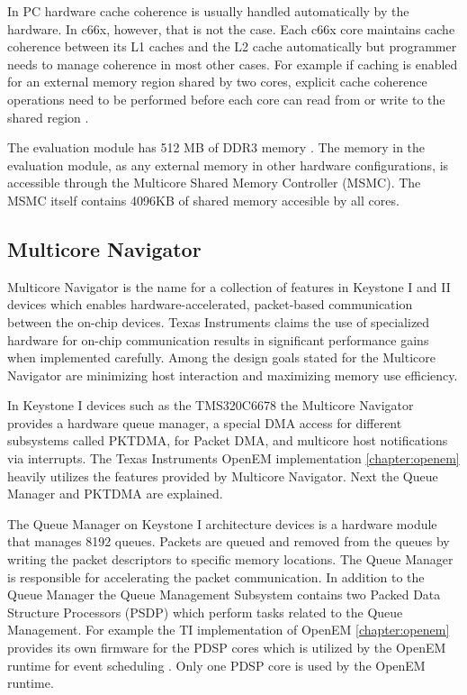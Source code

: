 In PC hardware cache coherence is usually handled automatically by the hardware. In c66x, however, that is not the case. Each c66x core maintains cache coherence between its L1 caches and the L2 cache automatically but programmer needs to manage coherence in most other cases. For example if caching is enabled for an external memory region shared by two cores, explicit cache coherence operations need to be performed before each core can read from or write to the shared region \cite{cacheguide}.

The evaluation module has 512 MB of DDR3 memory \cite{evmref}. The memory in the evaluation module, as any external memory in other hardware configurations, is accessible through the Multicore Shared Memory Controller (MSMC). The MSMC itself contains 4096KB of shared memory accesible by all cores.

\subsection{Multicore Navigator}
\label{subsec:multicorenav}


Multicore Navigator is the name for a collection of features in Keystone I and II devices which enables hardware-accelerated, packet-based communication between the on-chip devices. Texas Instruments claims the use of specialized hardware for on-chip communication results in significant performance gains when implemented carefully. Among the design goals stated for the Multicore Navigator are minimizing host interaction and maximizing memory use efficiency. \cite{navigator}

In Keystone I devices such as the TMS320C6678 the Multicore Navigator provides a hardware queue manager, a special DMA access for different subsystems called PKTDMA, for Packet DMA, and multicore host notifications via interrupts. \cite{navigator} The Texas Instruments OpenEM implementation \ref{chapter:openem} heavily utilizes the features provided by Multicore Navigator. Next the Queue Manager and PKTDMA are explained.

The Queue Manager on Keystone I architecture devices is a hardware module that manages 8192 queues. Packets are queued and removed from the queues by writing the packet descriptors to specific memory locations. The Queue Manager is responsible for accelerating the packet communication. In addition to the Queue Manager the Queue Management Subsystem contains two Packed Data Structure Processors (PSDP) which perform tasks related to the Queue Management. \cite{navigator} For example the TI implementation of OpenEM \ref{chapter:openem} provides its own firmware for the PDSP cores which is utilized by the OpenEM runtime for event scheduling \cite{openemwhite}. Only one PDSP core is used by the OpenEM runtime.


